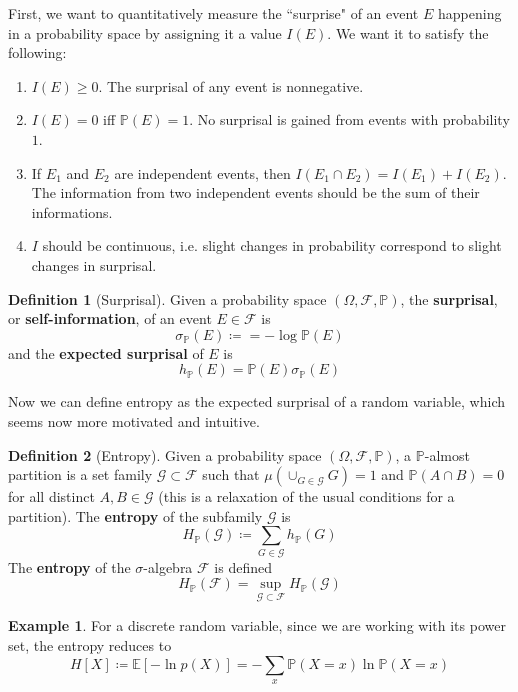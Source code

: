 \documentclass{article}
\theoremstyle{definition}
\newtheorem{example}{Example}[section]
\newtheorem{definition}{Definition}[section]
\begin{document}
    First, we want to quantitatively measure the ``surprise" of an event $E$ happening in a probability space by assigning it a value $I(E)$. We want it to satisfy the following: 
    \begin{enumerate}
        \item $I(E) \geq 0$. The surprisal of any event is nonnegative. 
        \item $I(E) = 0$ iff $\mathbb{P}(E) = 1$. No surprisal is gained from events with probability $1$. 
        \item If $E_1$ and $E_2$ are independent events, then $I(E_1 \cap E_2) = I(E_1) + I(E_2)$. The information from two independent events should be the sum of their informations. 
        \item $I$ should be continuous, i.e. slight changes in probability correspond to slight changes in surprisal. 
    \end{enumerate}

    \begin{definition}[Surprisal]
    Given a probability space $(\Omega, \mathcal{F}, \mathbb{P})$, the \textbf{surprisal}, or \textbf{self-information}, of an event $E \in \mathcal{F}$ is 
    \[\sigma_\mathbb{P} (E) \coloneqq = - \log \mathbb{P}(E)\]
    and the \textbf{expected surprisal} of $E$ is 
    \[h_\mathbb{P} (E) = \mathbb{P}(E) \sigma_\mathbb{P} (E)\]
    \end{definition}

    Now we can define entropy as the expected surprisal of a random variable, which seems now more motivated and intuitive. 

    \begin{definition}[Entropy]
    Given a probability space $(\Omega, \mathcal{F}, \mathbb{P})$, a $\mathbb{P}$-almost partition is a set family $\mathcal{G} \subset \mathcal{F}$ such that $\mu(\cup_{G \in \mathcal{G}} G) = 1$ and $\mathbb{P}(A \cap B) = 0$ for all distinct $A, B \in \mathcal{G}$ (this is a relaxation of the usual conditions for a partition). The \textbf{entropy} of the subfamily $\mathcal{G}$ is 
    \[H_\mathbb{P} (\mathcal{G}) \coloneqq \sum_{G \in \mathcal{G}} h_\mathbb{P}(G)\]
    The \textbf{entropy} of the $\sigma$-algebra $\mathcal{F}$ is defined 
    \[H_\mathbb{P} (\mathcal{F}) = \sup_{\mathcal{G} \subset \mathcal{F}} H_\mathbb{P} (\mathcal{G})\]
    \end{definition}

    \begin{example}
    For a discrete random variable, since we are working with its power set, the entropy reduces to 
    \[H[X] \coloneqq \mathbb{E}[-\ln{p(X)}] = -\sum_x \mathbb{P}(X = x) \ln{\mathbb{P}(X = x)}\]
    \end{example}
\end{document}
